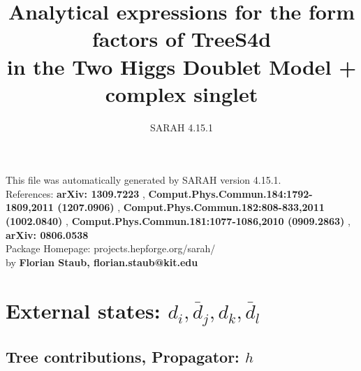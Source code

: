 \documentclass[A4,landscape]{article}
\begin{document}
\title{Analytical expressions for the form factors of TreeS4d\\ in the Two Higgs Doublet Model + complex singlet } 
 \author{SARAH 4.15.1} 
 \maketitle 
 \vspace{10cm} 
This file was automatically generated by SARAH version 4.15.1.  \\ 
References: {\bf arXiv: 1309.7223 }, {\bf Comput.Phys.Commun.184:1792-1809,2011 (1207.0906) }, {\bf Comput.Phys.Commun.182:808-833,2011 (1002.0840) }, {\bf Comput.Phys.Commun.181:1077-1086,2010 (0909.2863) }, {\bf arXiv: 0806.0538 } \\ 
Package Homepage: projects.hepforge.org/sarah/ \\ 
by {\bf Florian Staub, florian.staub@kit.edu} 
 \pagebreak 
 \tableofcontents 
 \pagebreak 
\section{External states: ${d_{{i}}, \bar{d}_{{j}}, d_{{k}}, \bar{d}_{{l}}}$} 
\subsection{Tree contributions, Propagator: $h$} 
\end{document}
